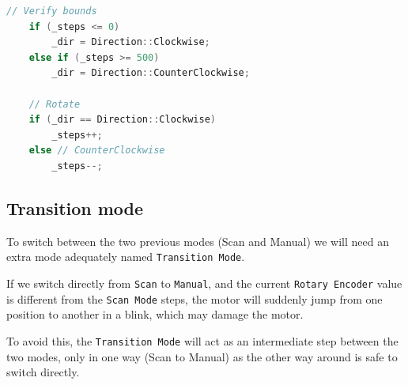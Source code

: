 \documentclass{article}
\begin{document}
\begin{lstlisting}[language=C++, caption={Scan Mode handler}]
    // Verify bounds
    if (_steps <= 0)
        _dir = Direction::Clockwise;
    else if (_steps >= 500)
        _dir = Direction::CounterClockwise;
        
    // Rotate
    if (_dir == Direction::Clockwise)
        _steps++;
    else // CounterClockwise
        _steps--;
\end{lstlisting}

\subsection{Transition mode}

To switch between the two previous modes (Scan and Manual) we will need an extra mode adequately named \verb|Transition Mode|.

If we switch directly from \verb|Scan| to \verb|Manual|, and the current \verb|Rotary Encoder| value is different from the \verb|Scan Mode| steps, the motor will suddenly jump from one position to another in a blink, which may damage the motor.

To avoid this, the \verb|Transition Mode| will act as an intermediate step between the two modes, only in one way (Scan to Manual) as the other way around is safe to switch directly.
\end{document}
